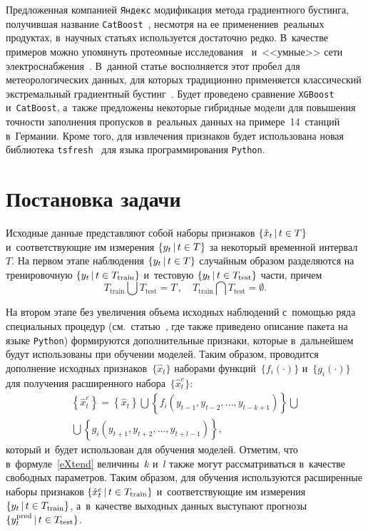 \begin{multicols}{2}
Предложенная компанией \verb"Яндекс" модификация метода градиентного 
бустинга, получившая название \verb"CatBoost"~\cite{Prokhorenkova2018}, 
несмотря на ее 
применение\linebreak в~реальных продуктах, в~научных статьях используется достаточно редко. 
В~качестве примеров можно упомянуть протеомные исследования~\cite{Ivanov2019} 
и~<<умные>> сети электроснабжения~\cite{Punmiya2019}. 
В~данной статье восполняется этот пробел для метеорологических данных, для 
которых традиционно применяется классический экстремальный градиентный 
бустинг~\cite{Korner2018,Fan2018}. Будет проведено сравнение \verb"XGBoost" 
и~\verb"CatBoost", а~также предложены некоторые гибридные модели для повышения 
точ\-ности заполнения пропусков в~реальных данных на примере~14~станций в~Германии. 
Кроме того, для извлечения признаков будет использована новая библиотека 
\verb"tsfresh"~\cite{Christ2018} для языка программирования \verb"Python".

\section{Постановка задачи}


Исходные данные представляют собой наборы признаков 
$\{\hat{x}_t\,|\,t \hm\in T\}$ и~соответствующие им измерения $\{y_t\,|\,t \hm\in T\}$ 
за некоторый временной интервал~$T$. На первом этапе наблюдения $\{y_t\,|\,t\hm \in T\}$ 
случайным образом разделяются на тренировочную $\{y_t\,|\,t \hm\in T_{\mathrm{train}}\}$ 
и~тестовую $\{y_t\,|\,t \hm\in T_{\mathrm{test}}\}$ части, причем 
\begin{equation*}
T_{\mathrm{train}} \bigcup T_{\mathrm{test}} = T\,, \quad T_{\mathrm{train}} 
\bigcap T_{\mathrm{test}} = \emptyset.
\end{equation*}

На втором этапе без увеличения объема исходных наблюдений с~помощью 
ряда специальных процедур (см.\ статью~\cite{Christ2018}, где 
также приведено описание пакета на языке \verb"Python") 
формируются дополнительные признаки, которые в~дальнейшем 
будут использованы при обучении моделей. Таким образом, 
проводится дополнение исходных признаков~$\{\hat{x}_t\}$ 
наборами функций~$\{f_i(\cdot)\}$ и~$\{g_i(\cdot)\}$ для получения расширенного 
набора~$\{\hat{x}^e_t\}$:
\begin{multline}
\label{eXtend}
\left\{\hat{x}^e_t\right\} =\left\{\hat{x}_t\right\}\bigcup 
\left\{ f_i\left(y_{t-1}, y_{t-2}, \ldots, y_{t-k+1}\right) \right\} \bigcup{}\\
{}\bigcup
\left\{ g_i\left(y_{t+1}, y_{t+2}, \ldots, y_{t+l-1}\right)\right \},
\end{multline}
который и~будет использован для обучения моделей. Отметим, 
что  в~формуле~\eqref{eXtend} величины~$k$ и~$l$ также могут рассматриваться
 в~качестве свободных параметров. Таким образом, для обучения используются 
 расширенные наборы признаков $\{\hat{x}^e_t\,|\, t \hm\in T_{\mathrm{train}}\}$ 
 и~соответствующие им измерения $\{y_t\,|\,t \hm\in T_{\mathrm{train}}\}$, а~в~качестве 
 выходных данных выступают прогнозы $\{y^{\mathrm{pred}}_t\,|\,t \hm\in T_{\mathrm{test}}\}$.


\end{multicols}
